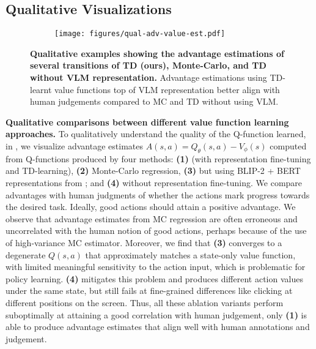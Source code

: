 \subsection{Qualitative Visualizations} \label{sec:qual-examples}
\begin{figure}[t]
     \centering
    \begin{subfigure}[b]{0.95\textwidth}
         \centering
    \texttt{[image: figures/qual-adv-value-est.pdf]}
     \end{subfigure}
     \vspace{2mm}
     \caption{\footnotesize{\textbf{Qualitative examples showing the advantage estimations of several transitions of TD (ours), Monte-Carlo, and TD without VLM representation.} Advantage estimations using TD-learnt value functions top of VLM representation better align with human judgements compared to MC and TD without using VLM.}}
        \label{fig:qual-adv-value-est}
\end{figure}

\textbf{Qualitative comparisons between different value function learning approaches.}  To qualitatively understand the quality of the Q-function learned, in , we visualize advantage estimates $A(s,a) = Q_{\theta}(s,a) - V_{\phi}(s)$ computed from Q-functions produced by four methods: \textbf{(1)} \ourmethod{} (with representation fine-tuning and TD-learning), \textbf{(2)} Monte-Carlo regression, \textbf{(3)} \ourmethod{} but using BLIP-2 + BERT representations from \citet{bai2024digirltraininginthewilddevicecontrol}; and \textbf{(4)} \ourmethod{} without representation fine-tuning. We compare advantages with human judgments of whether the actions mark progress towards the desired task. Ideally, good actions should attain a positive advantage. We observe that advantage estimates from MC regression are often erroneous and uncorrelated with the human notion of good actions, perhaps because of the use of high-variance MC estimator. 
Moreover, we find that \textbf{(3)} converges to a degenerate $Q(s,a)$ that approximately matches a state-only value function, with limited meaningful sensitivity to the action input, which is problematic for policy learning. \textbf{(4)} mitigates this problem and produces different action values under the same state, but still fails at fine-grained differences like clicking at different positions on the screen.
Thus, all these ablation variants perform suboptimally at attaining a good correlation with human judgement, only \textbf{(1)} \ourmethod{} is able to produce advantage estimates that align well with human annotations and judgement.




